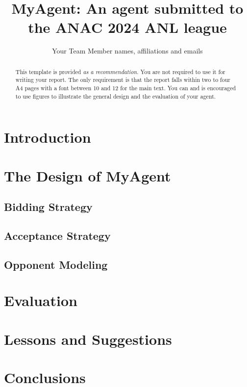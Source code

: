 \documentclass{article}
\title{MyAgent: An agent submitted to the ANAC 2024 ANL league}
\author{Your Team Member names, affiliations and emails}
\begin{document}
\maketitle
\begin{abstract}
	This template is provided \emph{as a recommendation}. You are not required
	to use it for writing your report. The only requirement is that the report
	falls within two to four A4 pages with a font between 10 and 12 for the main
	text. You can and is encouraged to use figures to illustrate the general
	design and the evaluation of your agent.
\end{abstract}
\section{Introduction}
\section{The Design of MyAgent}
\subsection{Bidding Strategy}
\subsection{Acceptance Strategy}
\subsection{Opponent Modeling}
\section{Evaluation}
\section{Lessons and Suggestions}
\section*{Conclusions}
\end{document}
